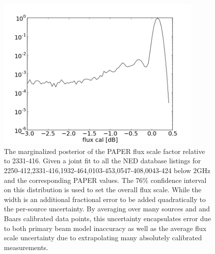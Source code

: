 \documentclass[preprint]{aastex}
\begin{document}
\begin{figure}
\centering
\includegraphics[width=0.9\textwidth]{plots/2250-412_2331-416_1932-464_0103-453_0547-408_0043-424_gain_mcmc_chain_gain_conf.png}
\caption{
The marginalized posterior of the PAPER flux scale factor relative to 2331-416. Given a joint fit to all the
 NED database listings for
2250-412,2331-416,1932-464,0103-453,0547-408,0043-424 below 2GHz and the corresponding PAPER values. The 76\% confidence 
interval on this distribution is used to set the overall flux scale. While the width is an additional fractional error to be added quadratically to the per-source uncertainty.  
By averaging over many sources and and Baars calibrated data points, this uncertainty encapsulates error due to both primary beam model inaccuracy 
as well as the average flux scale uncertainty due to extrapolating many absolutely calibrated measurements.
\label{fig:gain}}
\end{figure}
\end{document}
